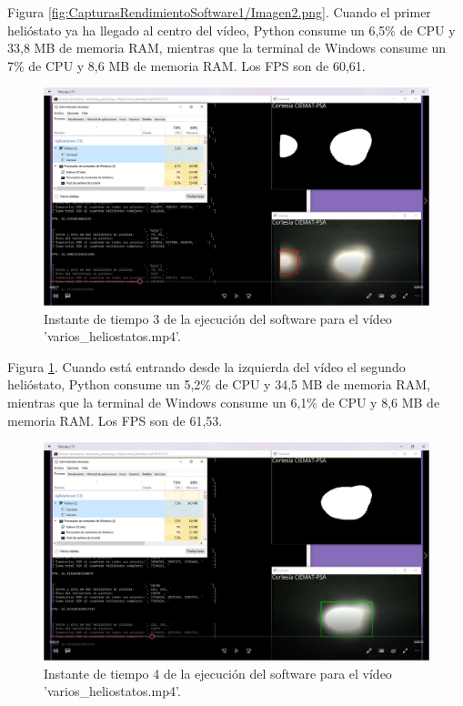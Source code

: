 Figura \ref{fig:CapturasRendimientoSoftware1/Imagen2.png}. Cuando el primer helióstato ya ha llegado al centro del vídeo, Python consume un 6,5\% de CPU y 33,8 MB de memoria RAM, mientras que la terminal de Windows consume un 7\% de CPU y 8,6 MB de memoria RAM. Los FPS son de 60,61.

\begin{figure}[h!]
  	\centering
	\includegraphics[width=\textwidth]{CapturasRendimientoSoftware1/Imagen3.png}
	\caption{Instante de tiempo 3 de la ejecución del software para el vídeo 'varios\_heliostatos.mp4'.
	\label{fig:CapturasRendimientoSoftware1/Imagen3.png}}
\end{figure}

Figura \ref{fig:CapturasRendimientoSoftware1/Imagen3.png}. Cuando está entrando desde la izquierda del vídeo el segundo helióstato, Python consume un 5,2\% de CPU y 34,5 MB de memoria RAM, mientras que la terminal de Windows consume un 6,1\% de CPU y 8,6 MB de memoria RAM. Los FPS son de 61,53.

\begin{figure}[h!]
  	\centering
	\includegraphics[width=\textwidth]{CapturasRendimientoSoftware1/Imagen4.png}
	\caption{Instante de tiempo 4 de la ejecución del software para el vídeo 'varios\_heliostatos.mp4'.
	\label{fig:CapturasRendimientoSoftware1/Imagen4.png}}
\end{figure}

